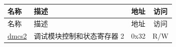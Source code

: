 \begin{longtable}{ | p{4.0cm} | p{8.4cm} | c | c| }
\hline\rowcolor{lightgray}
名称 & 描述 & 地址 & 访问 \\ \hline
\endfirsthead
\hline
\rowcolor{lightgray}
名称 & 描述 & 地址 & 访问  \\
\hline
\endhead
\endfoot

\hyperref[sec:riscvcpu-dmcs2-desc]{dmcs2} & 调试模块控制和状态寄存器 2 & 0x32 & R/W \\\hline

\end{longtable}

